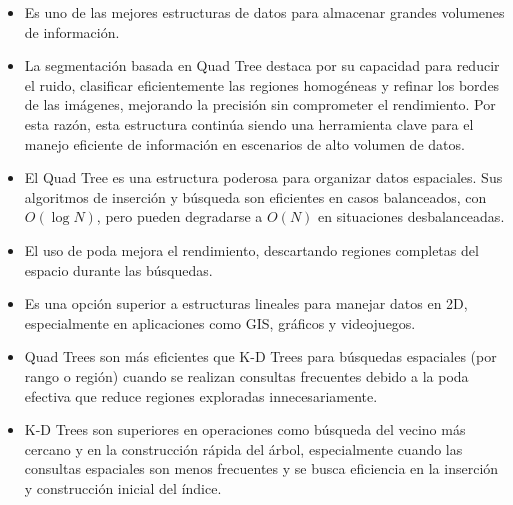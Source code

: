 \documentclass[9pt,a4paper,twoside]{rho-class/rho}
\begin{document}
    \begin{itemize}
        \item Es uno de las mejores estructuras de datos para almacenar grandes volumenes de información.
        \item La segmentación basada en Quad Tree destaca por su capacidad para reducir el ruido, clasificar eficientemente las regiones homogéneas y refinar los bordes de las imágenes, mejorando la precisión sin comprometer el rendimiento. Por esta razón, esta estructura continúa siendo una herramienta clave para el manejo eficiente de información en escenarios de alto volumen de datos.
        \item El Quad Tree es una estructura poderosa para organizar datos espaciales. Sus algoritmos de inserción y búsqueda son eficientes en casos balanceados, con $O(\log N)$, pero pueden degradarse a $O(N)$ en situaciones desbalanceadas.
        \item El uso de poda mejora el rendimiento, descartando regiones completas del espacio durante las búsquedas.
        \item Es una opción superior a estructuras lineales para manejar datos en 2D, especialmente en aplicaciones como GIS, gráficos y videojuegos.
        \item Quad Trees son más eficientes que K-D Trees para búsquedas espaciales (por rango o región) cuando se realizan consultas frecuentes debido a la poda efectiva que reduce regiones exploradas innecesariamente.
        \item K-D Trees son superiores en operaciones como búsqueda del vecino más cercano y en la construcción rápida del árbol, especialmente cuando las consultas espaciales son menos frecuentes y se busca eficiencia en la inserción y construcción inicial del índice.\\
    \end{itemize}

\printbibliography

\renewcommand{\contentsname}{Tabla de Contenidos}
\tableofcontents
\linenumbers


\end{document}
